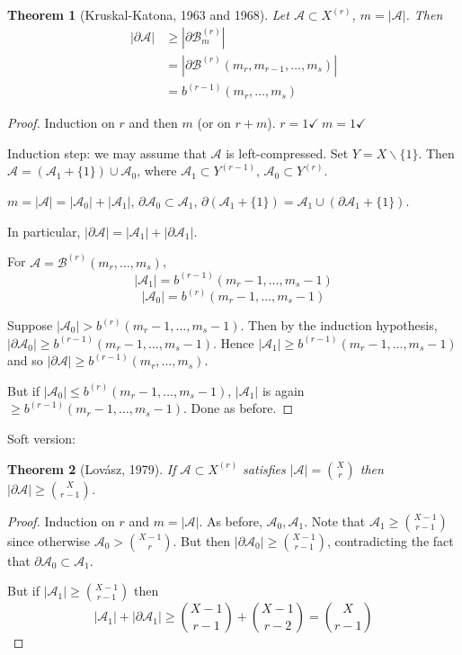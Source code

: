 \documentclass[a4paper]{article}
\newtheorem{theorem}{Theorem}
\newcommand*\abs[1]{\left|#1\right|}
\begin{document}
\begin{theorem}[Kruskal-Katona, 1963 and 1968]
	Let $\mathcal{A} \subset X^{(r)}$, $m = \abs{\mathcal{A}}$. Then
	\begin{align*}
		\abs{\partial\mathcal{A}} &\geq \abs{\partial\mathcal{B}_m^{(r)}} \\
		&= \abs{\partial\mathcal{B}^{(r)}(m_r, m_{r-1}, \dots, m_s)} \\
			&= b^{(r-1)}(m_r, \dots, m_s)
	\end{align*}
\end{theorem}
\begin{proof}
	Induction on $r$ and then $m$ (or on $r+m$). $r=1 \checkmark \ m=1 \checkmark$
	
	Induction step: we may assume that $\mathcal{A}$ is left-compressed. Set $Y = X \backslash \{1\}$. Then $\mathcal{A} = (\mathcal{A}_1 + \{1\}) \cup \mathcal{A}_0$, where $\mathcal{A}_1 \subset Y^{(r-1)}$, $\mathcal{A}_0 \subset Y^{(r)}$.
	
	$m=\abs{\mathcal{A}} = \abs{\mathcal{A}_0} + \abs{\mathcal{A}_1}$, $\partial \mathcal{A}_0 \subset \mathcal{A}_1$, $\partial(\mathcal{A}_1 + \{1\}) = \mathcal{A}_1 \cup (\partial\mathcal{A}_1 + \{1\})$.
	
	In particular, $\abs{\partial\mathcal{A}} = \abs{\mathcal{A}_1} + \abs{\partial\mathcal{A}_1}$.
	
	For $\mathcal{A} = \mathcal{B}^{(r)}(m_r, \dots, m_s)$, $$\abs{\mathcal{A}_1} = b^{(r-1)}(m_r-1,\dots,m_s-1)$$ $$\abs{\mathcal{A}_0} = b^{(r)}(m_r-1,\dots,m_s-1)$$
	
	Suppose $\abs{\mathcal{A}_0} > b^{(r)}(m_r-1,\dots,m_s-1)$. Then by the induction hypothesis, $\abs{\partial\mathcal{A}_0} \geq b^{(r-1)}(m_r-1,\dots,m_s-1)$. Hence $\abs{\mathcal{A}_1} \geq b^{(r-1)}(m_r-1, \dots, m_s-1)$ and so $\abs{\partial \mathcal{A}} \geq b^{(r-1)}(m_r, \dots, m_s)$.
	
	But if $\abs{\mathcal{A}_0} \leq b^{(r)}(m_r-1, \dots, m_s-1)$, $\abs{\mathcal{A}_1}$ is again $\geq b^{(r-1)}(m_r-1,\dots,m_s-1)$. Done as before.
\end{proof}

Soft version:
\begin{theorem}[Lov\'asz, 1979]
	If $\mathcal{A} \subset X^{(r)}$ satisfies $\abs{\mathcal{A}} = {X \choose r}$ then $\abs{\partial\mathcal{A}} \geq {X \choose r-1}$.
\end{theorem}
\begin{proof}
	Induction on $r$ and $m = \abs{\mathcal{A}}$. As before, $\mathcal{A}_0, \mathcal{A}_1$. Note that $\mathcal{A}_1 \geq {X-1 \choose r-1}$ since otherwise $\mathcal{A}_0 > {X-1 \choose r}$. But then $\abs{\partial\mathcal{A}_0} \geq {X-1 \choose r-1}$, contradicting the fact that $\partial\mathcal{A}_0 \subset \mathcal{A}_1$.
	
	But if $\abs{\mathcal{A}_1} \geq {X-1 \choose r-1}$ then $$\abs{\mathcal{A}_1} + \abs{\partial\mathcal{A}_1} \geq {X-1 \choose r-1} + {X-1 \choose r-2} = {X \choose r-1}$$
\end{proof}
\end{document}

